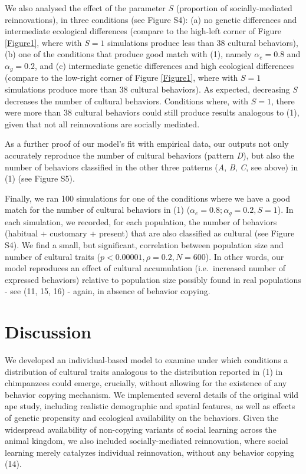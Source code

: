 \documentclass[9pt,twocolumn,twoside,]{pnas-new}
\begin{document}
We also analysed the effect of the parameter \(S\) (proportion of
socially-mediated reinnovations), in three conditions (see Figure S4):
(a) no genetic differences and intermediate ecological differences
(compare to the high-left corner of Figure \ref{Figure1}, where with
\(S=1\) simulations produce less than 38 cultural behaviors), (b) one of
the conditions that produce good match with (1), namely \(\alpha_e=0.8\)
and \(\alpha_g=0.2\), and (c) intermediate genetic differences and high
ecological differences (compare to the low-right corner of Figure
\ref{Figure1}, where with \(S=1\) simulations produce more than 38
cultural behaviors). As expected, decreasing \emph{S} decreases the
number of cultural behaviors. Conditions where, with \(S=1\), there were
more than 38 cultural behaviors could still produce results analogous to
(1), given that not all reinnovations are socially mediated.

As a further proof of our model's fit with empirical data, our outputs
not only accurately reproduce the number of cultural behaviors (pattern
\emph{D}), but also the number of behaviors classified in the other
three patterns (\emph{A}, \emph{B}, \emph{C}, see above) in (1) (see
Figure S5).

Finally, we ran 100 simulations for one of the conditions where we have
a good match for the number of cultural behaviors in (1)
(\(\alpha_e=0.8;\alpha_g=0.2, S=1\)). In each simulation, we recorded,
for each population, the number of behaviors (habitual + customary +
present) that are also classified as cultural (see Figure S4). We find a
small, but significant, correlation between population size and number
of cultural traits (\(p<0.00001,\rho=0.2,N=600\)). In other words, our
model reproduces an effect of cultural accumulation (i.e.~increased
number of expressed behaviors) relative to population size possibly
found in real populations - see (11, 15, 16) - again, in absence of
behavior copying.

\section*{Discussion}\label{discussion}

We developed an individual-based model to examine under which conditions
a distribution of cultural traits analogous to the distribution reported
in (1) in chimpanzees could emerge, crucially, without allowing for the
existence of any behavior copying mechanism. We implemented several
details of the original wild ape study, including realistic demographic
and spatial features, as well as effects of genetic propensity and
ecological availability on the behaviors. Given the widespread
availability of non-copying variants of social learning across the
animal kingdom, we also included socially-mediated reinnovation, where
social learning merely catalyzes individual reinnovation, without any
behavior copying (14).
\end{document}
